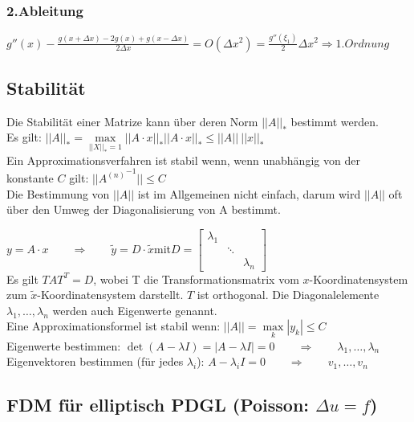 \subsubsection{2.Ableitung}
$g''(x) - \frac{g(x+\Delta x) -2 g(x)+ g(x-\Delta x)}{2\Delta x}= O(\Delta x^2)
= \frac{g''(\xi_1)}{2}\Delta x^2 \Rightarrow 1.Ordnung$

\subsection{Stabilität}
Die Stabilität einer Matrize kann über deren Norm $||A||_*$ bestimmt werden.\\

Es gilt: $||A||_*=\max\limits_{||X||_*=1}||A\cdot x||_*$\qquad$||A\cdot x||_*\leq||A||~||x||_*$\\

Ein Approximationsverfahren ist stabil wenn, wenn unabhängig von der konstante $C$ gilt:
$\boxed{||{A^{(n)}}^{-1}||\leq C}$\\



Die Bestimmung von $||A||$ ist im Allgemeinen nicht einfach, darum wird $||A||$ oft über den Umweg der Diagonalisierung von A bestimmt.

$y=A\cdot x\qquad\Rightarrow\qquad\tilde{y}=D\cdot\tilde{x}$\qquad mit\qquad $D=\begin{bmatrix}\lambda_1&&\\&\ddots&\\&&\lambda_n\end{bmatrix}$\\

Es gilt $TAT^T=D$, wobei T die Transformationsmatrix vom $x$-Koordinatensystem zum $\tilde{x}$-Koordinatensystem darstellt. $T$ ist orthogonal.
Die Diagonalelemente $\lambda_1,\ldots,\lambda_n$ werden auch Eigenwerte genannt.\\

Eine Approximationsformel ist stabil wenn: $\boxed{||A||=\max\limits_{k}|y_k|\leq C}$\\

Eigenwerte bestimmen: $\boxed{\det(A-\lambda I)=|A-\lambda I|=0}\qquad \Rightarrow \qquad \lambda_1,\ldots,\lambda_n$\\
Eigenvektoren bestimmen (für jedes $\lambda_i$): $A-\lambda_i I=0\qquad \Rightarrow \qquad v_1,\ldots,v_n$\\

\subsection{FDM für elliptisch PDGL (Poisson: $\Delta u = f$)}


